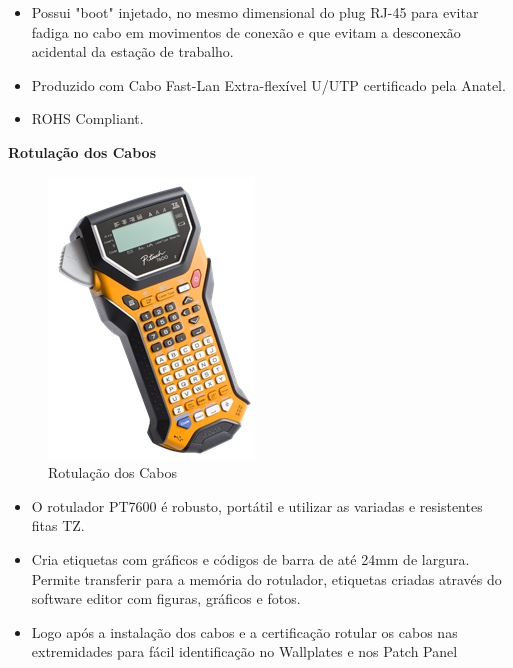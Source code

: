 \documentclass[	DIV=calc,%
paper=a4,%
fontsize=12pt,%
onecolumn]{scrartcl}	 					%
\begin{document}
	\begin{itemize}
		\item Possui "boot" injetado, no mesmo dimensional do plug RJ-45 para evitar fadiga no cabo em movimentos de conexão e que evitam a desconexão acidental da estação de trabalho. 
		\item Produzido com Cabo Fast-Lan Extra-flexível U/UTP certificado pela Anatel.
		\item ROHS Compliant.
	\end{itemize}
	
	\textbf{Rotulação dos Cabos}
	
	\begin{figure}[!h]
		\centering
		\caption{Rotulação dos Cabos}
		\includegraphics{rotulador_1}
	\end{figure}
	
	\begin{itemize}
		\item O rotulador PT7600 é robusto, portátil e utilizar as variadas e resistentes fitas TZ.
		\item Cria etiquetas com gráficos e códigos de barra de até 24mm de largura. Permite transferir para a memória do rotulador, etiquetas criadas através do software editor com figuras, gráficos e fotos.
		\item Logo após a instalação dos cabos e a certificação rotular os cabos nas extremidades para fácil identificação no Wallplates e nos Patch Panel
	\end{itemize}
	
\end{document}
